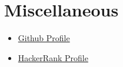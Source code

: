 \documentclass{resume}
\begin{document}

\section{Miscellaneous}
\begin{itemize}[parsep=0.5ex]
  \item \href{https://github.com/AdityaKomawar}{Github Profile} 
  \item \href{https://www.hackerrank.com/adityakomawar7}{HackerRank Profile} 
\end{itemize}

%
%
\end{document}
